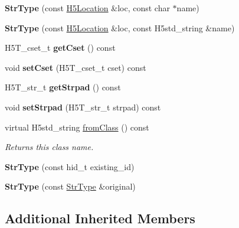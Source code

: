 \begin{DoxyCompactItemize}
{\bfseries Str\+Type} (const \hyperlink{class_h5_1_1_h5_location}{H5\+Location} \&loc, const char $\ast$name)
\item 
\mbox{\label{class_h5_1_1_str_type_af1ed3a7d611c9ebddc7bae244ca036e0}} 
{\bfseries Str\+Type} (const \hyperlink{class_h5_1_1_h5_location}{H5\+Location} \&loc, const H5std\+\_\+string \&name)
\item 
\mbox{\label{class_h5_1_1_str_type_aaaf069061e0b1fa0ef9ca34f797f9c84}} 
H5\+T\+\_\+cset\+\_\+t {\bfseries get\+Cset} () const
\item 
\mbox{\label{class_h5_1_1_str_type_aafd227ce5183cc51e9b40e976ecde2c7}} 
void {\bfseries set\+Cset} (H5\+T\+\_\+cset\+\_\+t cset) const
\item 
\mbox{\label{class_h5_1_1_str_type_ac48725b2342679db2a3aa43da7d73d81}} 
H5\+T\+\_\+str\+\_\+t {\bfseries get\+Strpad} () const
\item 
\mbox{\label{class_h5_1_1_str_type_aa10bc9b281e625b501f9918474f3bba0}} 
void {\bfseries set\+Strpad} (H5\+T\+\_\+str\+\_\+t strpad) const
\item 
\mbox{\label{class_h5_1_1_str_type_acafed9b8354f9578341682e29b5b6712}} 
virtual H5std\+\_\+string \hyperlink{class_h5_1_1_str_type_acafed9b8354f9578341682e29b5b6712}{from\+Class} () const
\begin{DoxyCompactList}\small\item\em Returns this class name. \end{DoxyCompactList}\item 
\mbox{\label{class_h5_1_1_str_type_aa3311a639210adc42df22c341a639440}} 
{\bfseries Str\+Type} (const hid\+\_\+t existing\+\_\+id)
\item 
\mbox{\label{class_h5_1_1_str_type_a8253ae1e61897694436d8fdd2efea985}} 
{\bfseries Str\+Type} (const \hyperlink{class_h5_1_1_str_type}{Str\+Type} \&original)
\end{DoxyCompactItemize}
\subsection*{Additional Inherited Members}


